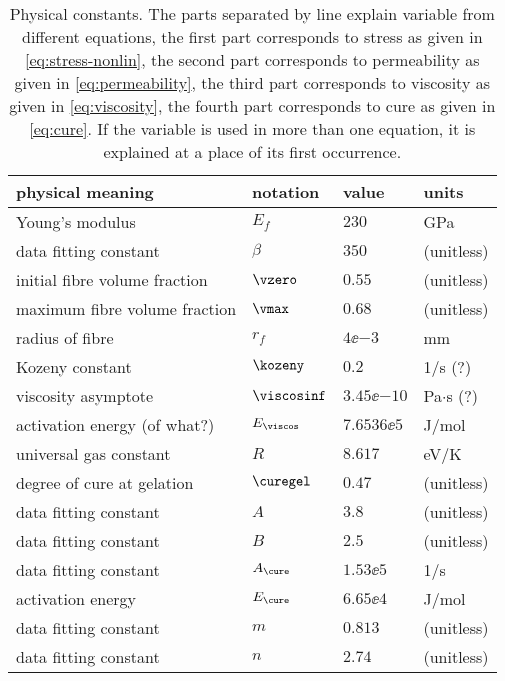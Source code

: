\documentclass[twoside,a4paper,12pt]{article}
\newcommand{\note}[1]{{\color{red}(#1)}}
\newcommand{\QM}{{\color{red}(?)}}
\begin{document}
\begin{table}[t]
  \centering
  \begin{tabular}{llll}
    \toprule
    physical meaning & notation & value & units \\
    \midrule
    Young's modulus               & $E_f$        & $230$         & GPa            \\ 
    data fitting constant         & $\beta$      & $350$         & (unitless)            \\
    initial fibre volume fraction & $\vzero$        & $0.55$        & (unitless)     \\
    maximum fibre volume fraction & $\vmax$        & $0.68$        & (unitless)     \\
    \midrule
    radius of fibre               & $r_f$        & $4\ee{-3}$    & mm             \\
    Kozeny constant              & $\kozeny$          & $0.2$         & 1/s \QM            \\
    \midrule
    viscosity asymptote     & $\viscosinf$ & $3.45\ee{-10}$ & Pa$\cdot$s \QM \\ 
    activation energy \note{of what?}    & $E_\viscos$ & $7.6536\ee{5}$& J/mol\\
    universal gas constant        & $R$          & $8.617$       & eV/K           \\
    degree of cure at  gelation   & $\curegel$   & $0.47$        & (unitless)            \\ 
    data fitting constant        &$A$ & $3.8$&(unitless)\\
    data fitting constant        &$B$ & $2.5$&(unitless)\\
    \midrule
     data fitting constant             &$A_\cure$&$1.53\ee{5}$& 1/s \\
     activation energy             &$E_\cure$& $6.65\ee{4}$  & J/mol          \\
     data fitting constant             &$m$&$0.813$& (unitless) \\
     data fitting constant             &$n$&$2.74$& (unitless) \\
    \bottomrule
  \end{tabular}
  \caption{Physical constants. The parts separated by line explain variable from different equations, the first part corresponds to stress as given in \eqref{eq:stress-nonlin}, the second part corresponds to permeability as given in \eqref{eq:permeability}, the third part corresponds to viscosity as given in \eqref{eq:viscosity}, the fourth part corresponds to cure as given in \eqref{eq:cure}. If the variable is used in more than one equation, it is explained at a place of its first occurrence.}
  \label{tab:phys-const}
\end{table}
\end{document}

